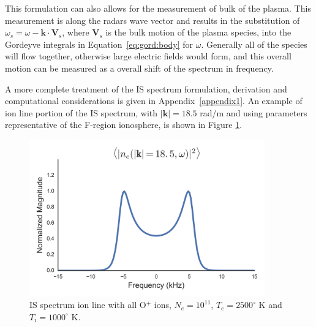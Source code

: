 This formulation can also allows for the measurement of bulk of the plasma. This measurement is along the radars wave vector and results in the substitution of $\omega_s=\omega-\mathbf{k}\cdot\mathbf{V}_s$, where $\mathbf{V}_s$ is the bulk motion of the plasma species, into the Gordeyve integrals in Equation~\ref{eq:gord:body} for $\omega$. Generally all of the species will flow together, otherwise large electric fields would form, and this overall motion can be measured as a overall shift of the spectrum in frequency.

A more complete treatment of the IS spectrum formulation, derivation and computational considerations is given in Appendix~\ref{appendix1}. An example of ion line portion of the IS spectrum, with  $|\mathbf{k}|=18.5$ rad/m and using parameters representative of the F-region ionosphere, is shown in Figure \ref{fig:ispecch2}. 
\begin{figure}[htb]
\centering
\includegraphics[width=4in]{Specion}
\caption{IS spectrum ion line with all O$^+$ ions, $N_e = 10^{11}$, $T_e=2500 ^\circ$ K and $T_i=1000 ^\circ$ K. }
\label{fig:ispecch2}
\end{figure}

